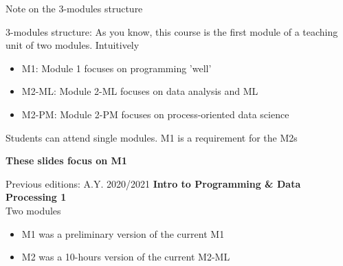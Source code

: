 \documentclass{beamer}%
\begin{document}
\begin{frame}{Note on the 3-modules structure}
	\begin{block}{3-modules structure: %
		}
		As you know, this course is the first module of a teaching unit of two modules. Intuitively
		\begin{itemize}
			\item M1: Module 1 focuses on programming 'well'
			\item M2-ML: Module 2-ML focuses  on data analysis and ML
			\item M2-PM: Module 2-PM focuses on process-oriented data science
		\end{itemize}
		Students can attend single modules. M1 is a requirement for the M2s
		\vspace{-0.4cm}
		\begin{center}\textbf{These slides focus on M1}\end{center}
	\end{block}	
	\begin{block}{Previous editions: A.Y. 2020/2021}
		\textbf{Intro to Programming \& Data Processing 1}\\ Two modules
		\begin{itemize}
			\item M1 was a preliminary version of the current M1
			\item M2 was a 10-hours version of the current M2-ML
		\end{itemize}
	\end{block}
\end{frame}
\end{document}
